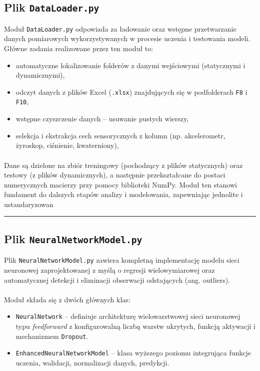 \documentclass{classrep}
\begin{document}
\clearpage{}
\subsection{Plik \texttt{DataLoader.py}}

Moduł \texttt{DataLoader.py} odpowiada za ładowanie oraz wstępne przetwarzanie danych pomiarowych wykorzystywanych w procesie uczenia i testowania modeli.
Główne zadania realizowane przez ten moduł to:
\begin{itemize}
	\item automatyczne lokalizowanie folderów z danymi wejściowymi (statycznymi i dynamicznymi),
	\item odczyt danych z plików Excel (\texttt{.xlsx}) znajdujących się w podfolderach \texttt{F8} i \texttt{F10},
	\item wstępne czyszczenie danych – usuwanie pustych wierszy,
	\item selekcja i ekstrakcja cech sensorycznych z kolumn (np. akcelerometr, żyroskop, ciśnienie, kwaterniony),
\end{itemize}
\paragraph{}
Dane są dzielone na zbiór treningowy (pochodzący z plików statycznych) oraz testowy (z plików dynamicznych), a następnie przekształcane do postaci numerycznych macierzy przy pomocy biblioteki NumPy.
Moduł ten stanowi fundament do dalszych etapów analizy i modelowania, zapewniając jednolite i ustandaryzowan

\noindent\rule{8cm}{0.4pt}

\subsection{Plik \texttt{NeuralNetworkModel.py}}

Plik \texttt{NeuralNetworkModel.py} zawiera kompletną implementację modelu sieci neuronowej zaprojektowanej z myślą o regresji wielowymiarowej oraz automatycznej detekcji i eliminacji obserwacji odstających (ang. outliers).

\paragraph{}
Moduł składa się z dwóch głównych klas:
\begin{itemize}
	\item \texttt{NeuralNetwork} – definiuje architekturę wielowarstwowej sieci neuronowej typu \textit{feedforward} z konfigurowalną liczbą warstw ukrytych, funkcją aktywacji i mechanizmem \texttt{Dropout}.
	\item \texttt{EnhancedNeuralNetworkModel} – klasa wyższego poziomu integrująca funkcje uczenia, walidacji, normalizacji danych, predykcji.
\end{itemize}
\end{document}
